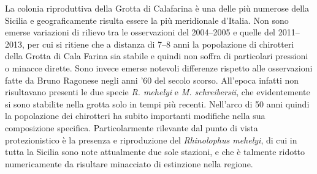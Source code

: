 {La colonia riproduttiva della Grotta di Calafarina è una delle più numerose della Sicilia e geograficamente risulta essere la più meridionale d'Italia. 
Non sono emerse variazioni di rilievo tra le osservazioni del 2004--2005 e quelle del 2011--2013, per cui si ritiene che a distanza di 7--8 anni la popolazione di chirotteri della Grotta di Cala Farina sia stabile e quindi non soffra di particolari pressioni o minacce dirette.  
Sono invece emerse notevoli differenze rispetto alle osservazioni fatte da Bruno Ragonese negli anni ’60 del secolo scorso. All’epoca infatti non risultavano presenti le due specie \emph{R. mehelyi} e \emph{M. schreibersii}, che evidentemente si sono stabilite nella grotta solo in tempi più recenti. Nell’arco di 50 anni quindi la popolazione dei chirotteri ha subito importanti modifiche nella sua composizione specifica. 
Particolarmente rilevante dal punto di vista protezionistico è la presenza e riproduzione del \emph{Rhinolophus mehelyi}, di cui in tutta la Sicilia sono note attualmente due sole stazioni, e che è talmente ridotto numericamente da risultare minacciato di estinzione nella regione.
} %